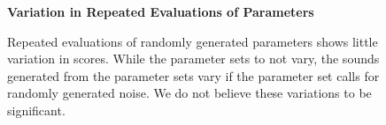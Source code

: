 \documentclass[\main/thesis.tex]{subfiles}
\begin{document}
\begin{figure}[htbp!]
\begin{center}
    \textbf{ Variation in Repeated Evaluations of Parameters }\par\medskip

    
\end{center}

\caption{Repeated evaluations of randomly generated parameters shows little variation in scores. While the parameter sets to not vary, the sounds generated from the parameter sets vary if the parameter set calls for randomly generated noise. We do not believe these variations to be significant.}
\label{fig:synth_deterministic}
\end{figure}
\end{document}
